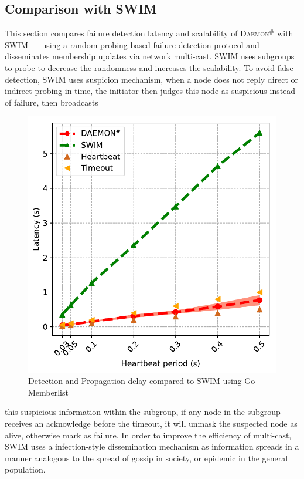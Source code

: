 \documentclass[sigconf]{acmart}
\newcommand{\ourwork}[0]{\textsc{Daemon}\ensuremath{^\#}\xspace}
\begin{document}
\subsection{Comparison with SWIM}
This section compares failure detection latency and scalability of \ourwork with SWIM~\cite{Abhinandan02} -- using a random-probing based failure detection protocol and disseminates membership updates via network multi-cast. SWIM uses subgroups to probe to decrease the randomness and increases the scalability. To avoid false detection, SWIM uses suspicion mechanism, when a node does not reply direct or indirect probing in time, the initiator then judges this node as suspicious instead of failure, then broadcasts
\begin{figure}[h]
  \centering
  \includegraphics[width=\linewidth]{HB_prrte_swim.pdf}
  \caption{Detection and Propagation delay compared to SWIM using Go-Memberlist}
  \label{fig:hb_prrte_swim}
\end{figure}
this suspicious information within the subgroup, if any node in the subgroup receives an acknowledge before the timeout, it will unmask the suspected node as alive, otherwise mark as failure. In order to improve the efficiency of multi-cast, SWIM uses a infection-style dissemination mechanism as information spreads in a manner analogous to the spread of gossip in society, or epidemic in the general population.
\end{document}
